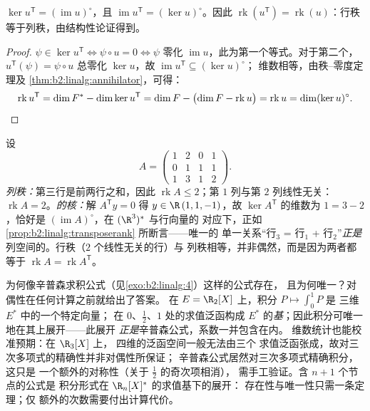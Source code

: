 \begin{proposition}\label{prop:b2:linalg:transposerank}
$\ker u^{\mathsf T} = (\operatorname{im} u)^{\circ}$，且
$\operatorname{im} u^{\mathsf T} = (\ker u)^{\circ}$。因此
$\operatorname{rk}(u^{\mathsf T}) = \operatorname{rk}(u)$：行秩
等于列秩，由结构性论证得到。
\end{proposition}

\begin{proof}
$\psi \in \ker u^{\mathsf T} \iff \psi \circ u = 0 \iff \psi$ 零化
$\operatorname{im} u$，此为第一个等式。对于第二个，$u^{\mathsf
T}(\psi) = \psi \circ u$ 总零化 $\ker u$，故
$\operatorname{im} u^{\mathsf T} \subseteq (\ker u)^\circ$；
维数相等，由秩–零度定理及
\cref{thm:b2:linalg:annihilator}，可得：
\[
\operatorname{rk} u^{\mathsf T} = \dim F^* - \dim\ker u^{\mathsf T}
= \dim F - \bigl(\dim F - \operatorname{rk} u\bigr)
= \operatorname{rk} u
= \dim (\ker u)^{\circ} . \qedhere
\]
\end{proof}

\begin{example}[从两侧读秩]\label{ex:b2:linalg:rankbothsides}
设
\[
A = \begin{pmatrix}
1 & 2 & 0 & 1\\
0 & 1 & 1 & 1\\
1 & 3 & 1 & 2
\end{pmatrix} .
\]
\emph{列秩：}第三行是前两行之和，因此
$\operatorname{rk} A \leq 2$；第 $1$ 列与第 $2$ 列线性无关：
$\operatorname{rk} A = 2$。\emph{的核：}解
$A^{\mathsf T}y = 0$ 得 $y \in \R\,(1, 1, -1)$，故 $\ker
A^{\mathsf T}$ 的维数为 $1 = 3 - 2$，恰好是
$(\operatorname{im} A)^\circ$，在 $(\R^3)^*$ 与行向量的
对应下，正如
\cref{prop:b2:linalg:transposerank} 所断言——唯一的
单一关系“行$_3$ = 行$_1$ + 行$_2$”\emph{正是}
列空间的。行秩（$2$ 个线性无关的行）与
列秩相等，并非偶然，而是因为两者都等于
$\operatorname{rk} A = \operatorname{rk} A^{\mathsf T}$。
\end{example}

\begin{example}[对偶性读出求积公式]\label{ex:b2:linalg:quadratureread}
为何像辛普森求积公式（见\cref{exo:b2:linalg:4}）这样的公式存在，
且为何唯一？对偶性在任何计算之前就给出了答案。
在 $E = \R_2[X]$ 上，积分 $P \mapsto \int_0^1 P$ 是
三维 $E^*$ 中的一个特定向量；
在 $0$、$\frac12$、$1$ 处的求值泛函构成
$E^*$ 的\emph{基}；因此积分可唯一地在其上展开——此展开
\emph{正是}辛普森公式，系数一并包含在内。
维数统计也能校准预期：在 $\R_3[X]$ 上，
四维的泛函空间一般无法由三个
求值泛函张成，故对三次多项式的精确性并非对偶性所保证；
辛普森公式居然对三次多项式精确积分，这只是
一个额外的对称性（关于 $\frac12$ 的奇次项相消），
需手工验证。含 $n + 1$ 个节点的公式是
积分形式在 $\R_n[X]^*$ 的求值基下的展开：
存在性与唯一性只需一条定理；仅
额外的次数需要付出计算代价。
\end{example}

